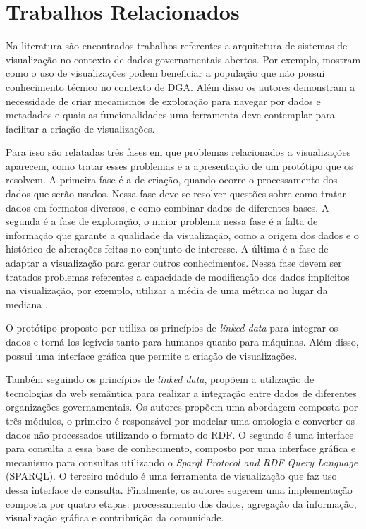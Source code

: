 
\chapter{Trabalhos Relacionados}
\label{chap:trabRelac}

Na literatura são encontrados trabalhos referentes a arquitetura de sistemas de visualização 
no contexto de dados governamentais abertos.  Por exemplo,  mostram 
como o uso de visualizações podem beneficiar a população que não possui conhecimento técnico 
no contexto de DGA. Além disso os autores demonstram a necessidade de criar mecanismos de 
exploração para navegar por dados e metadados e quais as funcionalidades uma ferramenta deve 
contemplar para facilitar a criação de visualizações.

Para isso são relatadas três fases em que problemas relacionados a visualizações aparecem, 
como tratar esses problemas e a apresentação de um protótipo que os resolvem. A primeira fase 
é a de criação, quando ocorre o processamento dos dados que serão usados. Nessa fase deve-se 
resolver questões sobre como tratar dados em formatos diversos, e como combinar dados de 
diferentes bases. A segunda é a fase de exploração, o maior problema nessa fase é a falta de 
informação que garante a qualidade da visualização, como a origem dos dados e o histórico de 
alterações feitas no conjunto de interesse. A última é a fase de adaptar a visualização para 
gerar outros conhecimentos. Nessa fase devem ser tratados problemas referentes a capacidade 
de modificação dos dados implícitos na visualização, por exemplo, utilizar a média de uma 
métrica no lugar da mediana \cite{graves2013}.

O protótipo proposto por  utiliza os princípios de \textit{linked data} 
para integrar os dados e torná-los legíveis tanto para humanos quanto para máquinas. Além 
disso, possui uma interface gráfica que permite a criação de visualizações.

Também seguindo os princípios de \textit{linked data},  propõem a 
utilização de  tecnologias da web semântica para realizar a integração entre dados de 
diferentes organizações governamentais. Os autores propõem uma abordagem composta por três 
módulos, o primeiro é responsável por modelar uma ontologia e converter os dados não 
processados utilizando o formato do RDF. O segundo é uma interface para consulta a essa base 
de conhecimento, composto por uma interface gráfica e mecanismo para consultas utilizando o 
\textit{Sparql Protocol and RDF Query Language} (SPARQL). O terceiro módulo é uma ferramenta 
de visualização que faz uso dessa interface de consulta.  Finalmente, os autores sugerem uma 
implementação composta por quatro etapas: processamento dos dados, agregação da informação, 
visualização gráfica e contribuição da comunidade.

